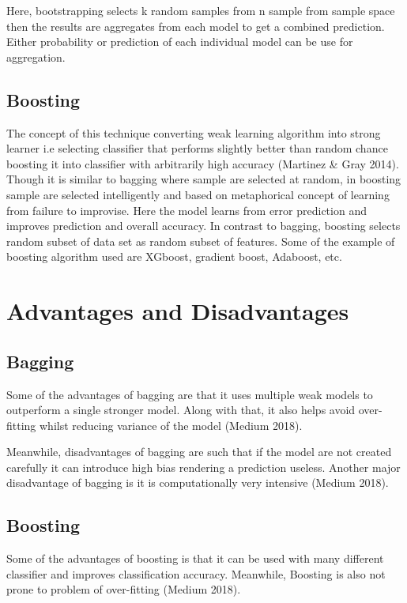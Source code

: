 \documentclass{article}
\begin{document}
Here, bootstrapping selects k random samples from n sample from sample space then the results are aggregates from each model to get a combined prediction. Either probability or prediction of each individual model can be use for aggregation.

\subsection{Boosting}\label{SEC:Methods }
The concept of this technique converting weak learning algorithm into strong learner i.e selecting classifier that performs slightly better than random chance boosting it into classifier with arbitrarily high accuracy (Martinez & Gray 2014). Though it is similar to bagging where sample are selected at random, in boosting sample are selected intelligently and based on metaphorical concept of learning from failure to improvise. Here the model learns from error prediction and improves prediction and overall accuracy. In contrast to bagging, boosting selects random subset of data set as random subset of features. Some of the example of boosting algorithm used are XGboost, gradient boost, Adaboost, etc.
    

\section{Advantages and Disadvantages}
\subsection{Bagging}\label{sec:Bagging}
Some of the advantages of bagging are that it uses multiple weak models to outperform a single stronger model. Along with that, it also helps avoid over-fitting whilst reducing variance of the model (Medium 2018).

Meanwhile, disadvantages of bagging are such that if the model are not created carefully it can introduce high bias rendering a prediction useless. Another major disadvantage of bagging is it is computationally very intensive (Medium 2018).

\subsection{Boosting}\label{SEC:boosting}
Some of the advantages of boosting is that it can be used with many different classifier and improves classification accuracy. Meanwhile, Boosting is also not prone to problem of over-fitting (Medium 2018). 
\end{document}
